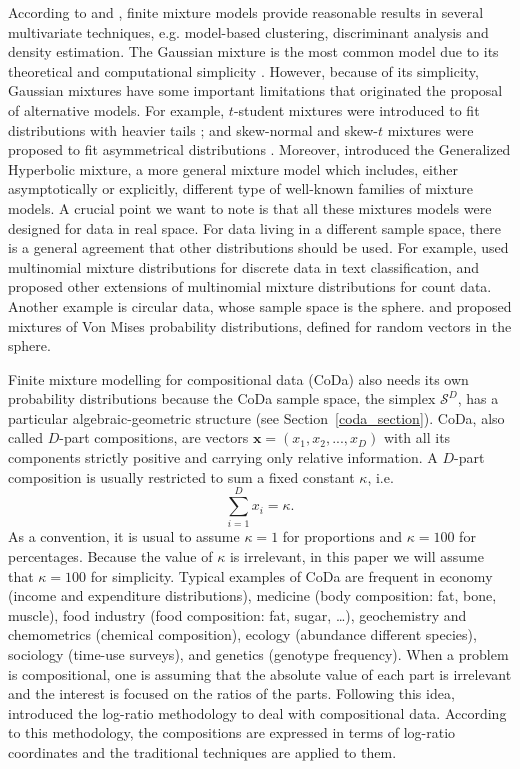 \documentclass[12pt, a4paper]{article}
\begin{document}
According to \cite{scott1971clustering} and \cite{mclachlan2000finite}, finite mixture models provide reasonable results in several multivariate techniques, e.g. model-based clustering, discriminant analysis and density estimation. The Gaussian mixture is the most common model due to its theoretical and computational simplicity \citep{mclachlan2000finite}. 
However, because of its simplicity, Gaussian mixtures have some important limitations 
that originated the proposal of alternative models. For example, $t$-student mixtures were introduced to fit distributions with heavier tails \citep{andrews2012model, lee2013finite, lin2010robust}; and skew-normal and skew-$t$ mixtures were proposed to fit asymmetrical distributions \citep{lee2011fitting}. Moreover, \cite{browne2013mixture} introduced the Generalized Hyperbolic mixture, a more general mixture model which includes, either asymptotically or explicitly, different type of well-known families of mixture models. A crucial point we want to note is that all these mixtures models were designed for data in real space. For data living in a different sample space, there is a general agreement that other distributions should be used. 
For example, \cite{bickel2004multi} used multinomial mixture distributions for discrete data in text classification, and  
 \cite{bouguila2011count} proposed other extensions of multinomial mixture distributions for count data. 
Another example is circular data, whose sample space is the sphere.  \cite{banerjee2005clustering} and \cite{mardia2007protein} proposed mixtures of Von Mises probability distributions, defined for random vectors in the sphere.

Finite mixture modelling for compositional data (CoDa) also needs its own probability distributions because the CoDa sample space, the simplex $\mathcal{S}^D$, has a particular algebraic-geometric structure (see Section~\ref{coda_section}).
CoDa, also called $D$-part compositions, are vectors $\textbf{x} = (x_1, x_2, ..., x_D)$ with all its components strictly positive  and carrying only relative information. A $D$-part composition is usually restricted to sum a fixed constant $\kappa$, i.e.
\begin{equation}
\sum_{i=1 }^D x_i = \kappa.
\label{sum_to_constant}
\end{equation}
As a convention, it is usual to assume $\kappa =1$ for proportions and $\kappa = 100$ for percentages. Because the value of $\kappa$ is irrelevant, in this paper we will assume that $\kappa = 100$ for simplicity. Typical examples of CoDa are frequent in economy (income and expenditure distributions), medicine (body composition: fat, bone, muscle), food industry (food composition: fat, sugar, …), geochemistry and chemometrics (chemical composition), ecology (abundance different species), sociology (time-use surveys), and genetics (genotype frequency). 
When a problem is compositional, one is assuming that the absolute value of each part is irrelevant and the interest is focused on the ratios of the parts. Following this idea, \cite{aitchison1986statistical} introduced the log-ratio methodology to deal with compositional data. According to this methodology, the compositions are expressed in terms of log-ratio coordinates and the traditional techniques are applied to them.
\end{document}
